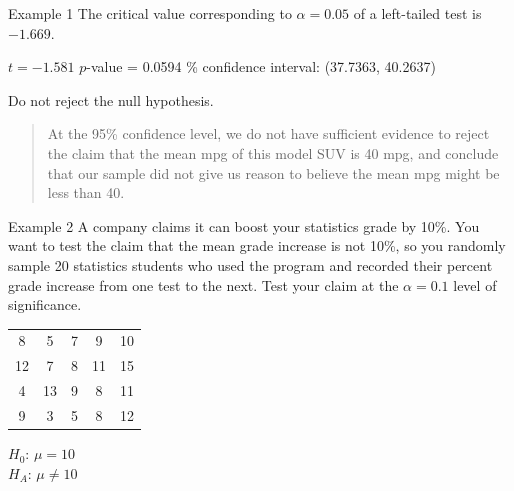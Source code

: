 \documentclass[t]{beamer}
\begin{document}
\begin{frame}{Example 1}
The critical value corresponding to $\alpha=0.05$ of a left-tailed test is $-1.669$. \newline\\	\pause

$t = -1.581$ \newline
$p$-value = 0.0594	\% confidence interval: (37.7363, 40.2637)	\newline\\	\pause

Do not reject the null hypothesis.	\newline\\ \pause
\begin{quote}
At the 95\% confidence level, we do not have sufficient evidence to reject the claim that the mean mpg of this model SUV is 40 mpg, and conclude that our sample did not give us reason to believe the mean mpg might be less than 40.
\end{quote}
\end{frame}

\begin{frame}{Example 2}
A company claims it can boost your statistics grade by 10\%. You want to test the claim that the mean grade increase is not 10\%, so you randomly sample 20 statistics students who used the program and recorded their percent grade increase from one test to the next. Test your claim at the $\alpha = 0.1$ level of significance. \newline\\

\begin{center}
\begin{tabular}{ccccc}
8 & 5 & 7 & 9 & 10 \\
12 & 7 & 8 & 11 & 15 \\
4 & 13 & 9 & 8 & 11 \\
9 & 3 & 5 & 8 & 12 \\
\end{tabular}
\end{center}
\pause

$H_0: \, \mu = 10$ \\
$H_A: \, \mu \neq 10$
\end{frame}
\end{document}
